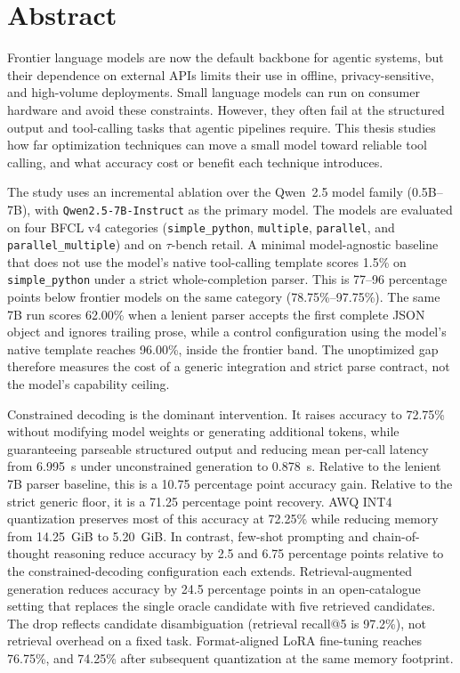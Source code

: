 \section*{Abstract}

Frontier language models are now the default backbone for agentic systems, but
their dependence on external APIs limits their use in offline,
privacy-sensitive, and high-volume deployments. Small language models can run on
consumer hardware and avoid these constraints. However, they often fail at the
structured output and tool-calling tasks that agentic pipelines require. This
thesis studies how far optimization techniques can move a small model toward
reliable tool calling, and what accuracy cost or benefit each technique
introduces.

The study uses an incremental ablation over the Qwen~2.5 model family
(0.5B--7B), with \texttt{Qwen2.5-7B-Instruct} as the primary model. The models
are evaluated on four BFCL v4 categories (\texttt{simple\_python},
\texttt{multiple}, \texttt{parallel}, and \texttt{parallel\_multiple}) and on
$\tau$-bench retail. A minimal model-agnostic baseline that does not use the
model's native tool-calling template scores 1.5\% on
\texttt{simple\_python} under a strict whole-completion parser. This is
77--96 percentage points below frontier models on the same category
(78.75\%--97.75\%). The same 7B run scores 62.00\% when a lenient parser
accepts the first complete JSON object and ignores trailing prose, while a
control configuration using the model's native template reaches 96.00\%,
inside the frontier band. The unoptimized gap therefore measures the cost of a
generic integration and strict parse contract, not the model's capability
ceiling.

Constrained decoding is the dominant intervention. It raises accuracy to
72.75\% without modifying model weights or generating additional tokens,
while guaranteeing parseable structured output and reducing mean per-call
latency from 6.995~s under unconstrained generation to 0.878~s. Relative to
the lenient 7B parser baseline, this is a 10.75 percentage point accuracy
gain. Relative to the strict generic floor, it is a 71.25 percentage point
recovery. AWQ INT4 quantization preserves most of this accuracy at 72.25\%
while reducing memory from 14.25~GiB to 5.20~GiB. In contrast, few-shot
prompting and chain-of-thought reasoning reduce accuracy by 2.5 and 6.75
percentage points relative to the constrained-decoding configuration each
extends. Retrieval-augmented generation reduces accuracy by 24.5 percentage
points in an open-catalogue setting that replaces the single oracle candidate
with five retrieved candidates. The drop reflects candidate disambiguation
(retrieval recall@5 is 97.2\%), not retrieval overhead on a fixed task.
Format-aligned LoRA fine-tuning reaches 76.75\%, and 74.25\% after subsequent
quantization at the same memory footprint.


